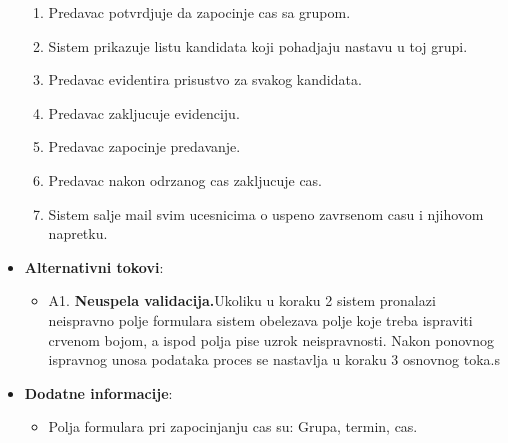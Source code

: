 \begin{itemize}
\begin{enumerate}
        \item Predavac potvrdjuje da zapocinje cas sa grupom.
        \item Sistem prikazuje listu kandidata koji pohadjaju nastavu u toj grupi.
        \item Predavac evidentira prisustvo za svakog kandidata.
        \item Predavac zakljucuje evidenciju.
        \item Predavac zapocinje predavanje.
        \item Predavac nakon odrzanog cas zakljucuje cas.
        \item Sistem salje mail svim ucesnicima o uspeno zavrsenom casu i njihovom napretku.
      \end{enumerate}

  \item \textbf{Alternativni tokovi}:
      \begin{itemize}
        \item A1. \textbf{Neuspela validacija.}Ukoliku u koraku 2 sistem pronalazi neispravno polje formulara sistem obelezava polje koje treba ispraviti crvenom bojom, a ispod polja pise  uzrok neispravnosti. Nakon ponovnog ispravnog unosa podataka proces se nastavlja u koraku 3 osnovnog toka.s
      \end{itemize}
      
 \item \textbf{Dodatne informacije}:
      \begin{itemize}
        \item Polja formulara pri zapocinjanju cas su: Grupa, termin, cas.
      \end{itemize}
\end{itemize}